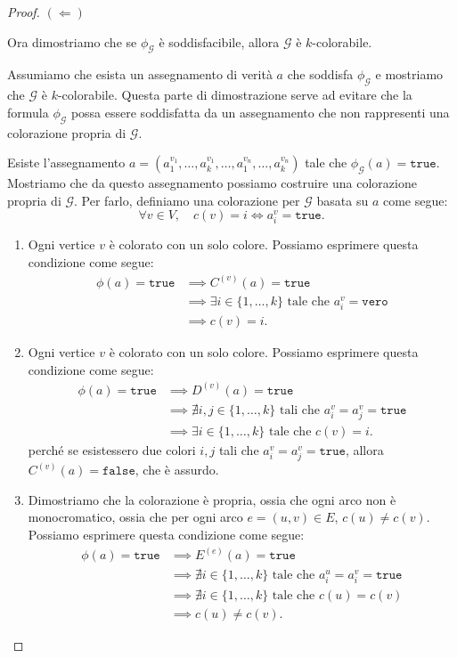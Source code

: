 \begin{proof}
    $(\Leftarrow)$

    Ora dimostriamo che se $\phi_\mathcal{G}$ è soddisfacibile, allora $\mathcal{G}$ è $k$-colorabile.

    Assumiamo che esista un assegnamento di verità $a$ che soddisfa $\phi_\mathcal{G}$ e mostriamo 
    che $\mathcal{G}$ è $k$-colorabile. Questa parte di dimostrazione serve ad evitare che 
    la formula $\phi_\mathcal{G}$ possa essere soddisfatta da un assegnamento che non rappresenti
    una colorazione propria di $\mathcal{G}$.

    Esiste l'assegnamento $a = (a_1^{v_1}, \ldots, a_k^{v_1}, \ldots, a_1^{v_n}, \ldots, a_k^{v_n})$ 
    tale che $\phi_\mathcal{G}(a) = \texttt{true}$. Mostriamo che da questo assegnamento possiamo
    costruire una colorazione propria di $\mathcal{G}$.
    Per farlo, definiamo una colorazione per $\mathcal{G}$ basata su $a$ come segue:
    \[
        \forall v \in V, \quad c(v) = i \iff a_i^v = \texttt{true}.
    \]
    \begin{enumerate}
        \item Ogni vertice $v$ è colorato con un solo colore. Possiamo esprimere questa condizione come segue:
        \begin{align*}
            \phi(a) = \texttt{true} & \implies C^{(v)}(a) = \texttt{true} \\
            & \implies \exists i \in \{1, \ldots, k\} \text{ tale che } a_i^v = \texttt{vero} \\
            & \implies c(v) = i.
        \end{align*}
        \item Ogni vertice $v$ è colorato con un solo colore. Possiamo esprimere questa
        condizione come segue:
        \begin{align*}
            \phi(a) = \texttt{true} & \implies D^{(v)}(a) = \texttt{true} \\
            & \implies \nexists i, j \in \{1, \ldots, k\}
            \text{ tali che } a_i^v = a_j^v = \texttt{true} \\
            & \implies \exists i \in \{1, \ldots, k\} \text{ tale che } c(v) = i.
        \end{align*}
        perché se esistessero due colori $i, j$ tali che $a_i^v = a_j^v = \texttt{true}$, allora
        $C^{(v)}(a) = \texttt{false}$, che è assurdo.
        \item Dimostriamo che la colorazione è propria, ossia che ogni arco non è monocromatico,
        ossia che per ogni arco $e = (u, v) \in E$, $c(u) \neq c(v)$. Possiamo esprimere questa
        condizione come segue:
        \begin{align*}
            \phi(a) = \texttt{true} & \implies E^{(e)}(a) = \texttt{true} \\
            & \implies \nexists i \in \{1, \ldots, k\} \text{ tale che } a_i^u = a_i^v = \texttt{true} \\
            & \implies \nexists i \in \{1, \ldots, k\} \text{ tale che } c(u) = c(v) \\
            & \implies c(u) \neq c(v).
        \end{align*}
    \end{enumerate}


\end{proof}
